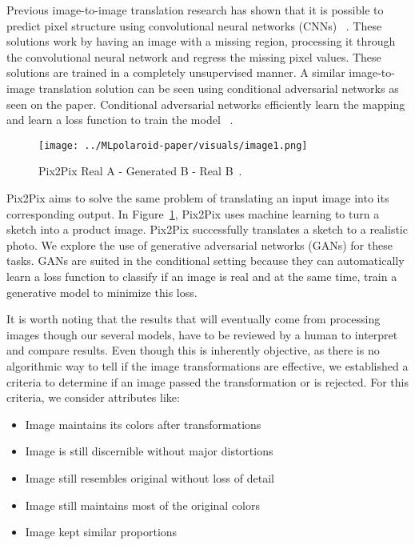 \documentclass[conference]{IEEEtran}
\begin{document}
Previous image-to-image translation research has shown that it is possible to predict pixel structure using convolutional neural networks (CNNs) ~\cite{Pathak_2016_CVPR}.
These solutions work by having an image with a missing region, processing it through the convolutional neural network and regress the missing pixel values. These solutions are trained in a completely unsupervised manner.
A similar image-to-image translation solution can be seen using conditional adversarial networks as seen on the paper. Conditional adversarial networks efficiently learn the mapping and learn a loss function to train the model ~\cite{isola2017image}. 

\begin{figure}[htb!]
	\begin{center}
	\texttt{[image: ../MLpolaroid-paper/visuals/image1.png]}
	\caption{Pix2Pix Real A - Generated B - Real B~\cite{isola2017image}. }
	\label{fig:img1} 
	\end{center}
\end{figure}


Pix2Pix aims to solve the same problem of translating an input image into its corresponding output. In Figure~\ref{fig:img1}, Pix2Pix uses machine learning to turn a sketch into a product image. Pix2Pix successfully translates a sketch to a realistic photo. 
We explore the use of generative adversarial networks (GANs) for these tasks. GANs are suited in the conditional setting because they can automatically learn a loss function to classify if an image is real and at the same time, train a generative model to minimize this loss. 

It is worth noting that the results that will eventually come from processing images though our several models, have to be reviewed by a human to interpret and compare results. Even though this is inherently objective, as there is no algorithmic way to tell if the image transformations are effective, we established a criteria to determine if an image passed the transformation or is rejected. For this criteria, we consider attributes like: 
\begin{itemize}
	\item Image maintains its colors after transformations
	\item Image is still discernible without major distortions
	\item Image still resembles original without loss of detail
	\item Image still maintains most of the original colors
	\item Image kept similar proportions
\end{itemize}
\end{document}
